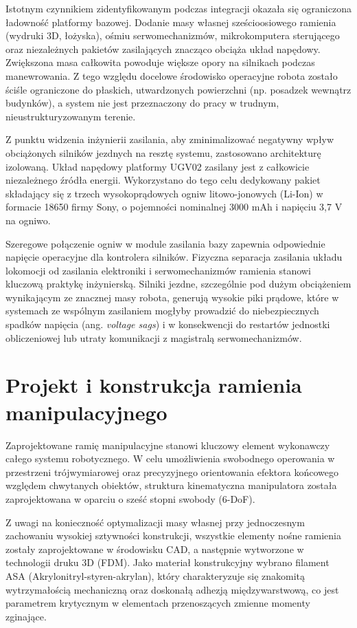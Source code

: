 \documentclass[11pt]{extreport}
\begin{document}
Istotnym czynnikiem zidentyfikowanym podczas integracji okazała się ograniczona ładowność platformy bazowej. Dodanie masy własnej sześcioosiowego ramienia (wydruki 3D, łożyska), ośmiu serwomechanizmów, mikrokomputera sterującego oraz niezależnych pakietów zasilających znacząco obciąża układ napędowy. Zwiększona masa całkowita powoduje większe opory na silnikach podczas manewrowania. Z tego względu docelowe środowisko operacyjne robota zostało ściśle ograniczone do płaskich, utwardzonych powierzchni (np. posadzek wewnątrz budynków), a system nie jest przeznaczony do pracy w trudnym, nieustrukturyzowanym terenie.

Z punktu widzenia inżynierii zasilania, aby zminimalizować negatywny wpływ obciążonych silników jezdnych na resztę systemu, zastosowano architekturę izolowaną. Układ napędowy platformy UGV02 zasilany jest z całkowicie niezależnego źródła energii. Wykorzystano do tego celu dedykowany pakiet składający się z trzech wysokoprądowych ogniw litowo-jonowych (Li-Ion) w formacie 18650 firmy Sony, o pojemności nominalnej 3000 mAh i napięciu 3,7 V na ogniwo. 

Szeregowe połączenie ogniw w module zasilania bazy zapewnia odpowiednie napięcie operacyjne dla kontrolera silników. Fizyczna separacja zasilania układu lokomocji od zasilania elektroniki i serwomechanizmów ramienia stanowi kluczową praktykę inżynierską. Silniki jezdne, szczególnie pod dużym obciążeniem wynikającym ze znacznej masy robota, generują wysokie piki prądowe, które w systemach ze wspólnym zasilaniem mogłyby prowadzić do niebezpiecznych spadków napięcia (ang. \textit{voltage sags}) i w konsekwencji do restartów jednostki obliczeniowej lub utraty komunikacji z magistralą serwomechanizmów.

\section{Projekt i konstrukcja ramienia manipulacyjnego}

Zaprojektowane ramię manipulacyjne stanowi kluczowy element wykonawczy całego systemu robotycznego. W celu umożliwienia swobodnego operowania w przestrzeni trójwymiarowej oraz precyzyjnego orientowania efektora końcowego względem chwytanych obiektów, struktura kinematyczna manipulatora została zaprojektowana w oparciu o sześć stopni swobody (6-DoF). 

Z uwagi na konieczność optymalizacji masy własnej przy jednoczesnym zachowaniu wysokiej sztywności konstrukcji, wszystkie elementy nośne ramienia zostały zaprojektowane w środowisku CAD, a następnie wytworzone w technologii druku 3D (FDM). Jako materiał konstrukcyjny wybrano filament ASA (Akrylonitryl-styren-akrylan), który charakteryzuje się znakomitą wytrzymałością mechaniczną oraz doskonałą adhezją międzywarstwową, co jest parametrem krytycznym w elementach przenoszących zmienne momenty zginające.
\end{document}
